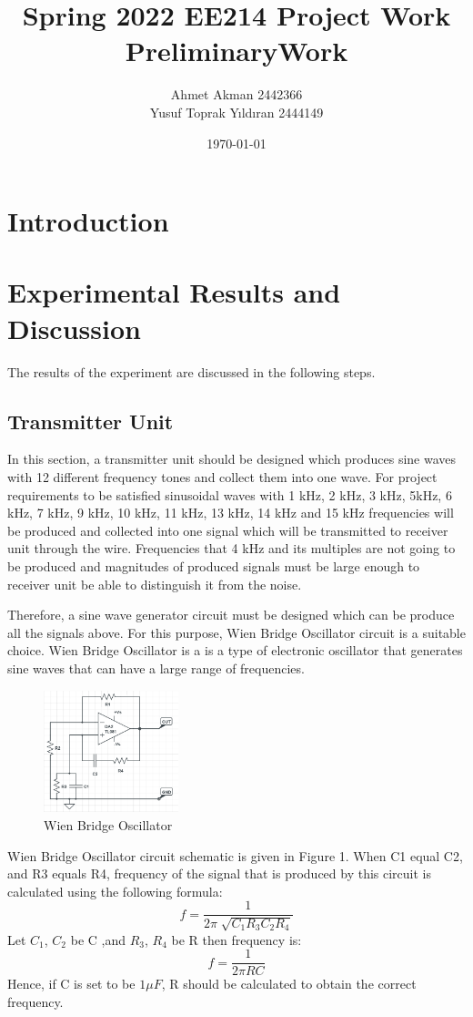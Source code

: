 \documentclass[letterpaper,12pt]{article}
\begin{document}
\thispagestyle{empty}

\title{Spring 2022 EE214 Project Work  \protect\\ PreliminaryWork }
\author{Ahmet Akman 2442366 \protect\\ Yusuf Toprak Yıldıran 2444149 }
\date{\today}
\maketitle
\tableofcontents
\section{Introduction}
\section{Experimental Results and Discussion}
The results of the experiment are discussed in the following steps.
%
\subsection{Transmitter Unit}
In this section, a transmitter unit should be designed which produces sine waves with 12 different frequency tones and collect them into one wave. For project requirements to be satisfied sinusoidal waves with 1 kHz, 2 kHz, 3 kHz, 5kHz, 6 kHz, 7 kHz, 9 kHz, 10 kHz, 11 kHz, 13 kHz, 14 kHz and 15 kHz frequencies will be produced and collected into one signal which will be transmitted to receiver unit through the wire. Frequencies that 4 kHz and its multiples are not going to be produced and magnitudes of produced signals must be large enough to receiver unit be able to distinguish it from the noise.

Therefore, a sine wave generator circuit must be designed which can be produce all the signals above. For this purpose, Wien Bridge Oscillator circuit is a suitable choice. Wien Bridge Oscillator is a is a type of electronic oscillator that generates sine waves that can have a large range of frequencies.
\begin{figure}[H]
    \centering
    \includegraphics[width = 0.35\textwidth]{WIENBRDGE.png}
    \caption{Wien Bridge Oscillator}
\end{figure} 
Wien Bridge Oscillator circuit schematic is given in Figure 1. When C1 equal C2, and R3 equals R4, frequency of the signal that is produced by this circuit is calculated using the following formula:
\[f = \frac{1}{2\pi \sqrt[]{C_1R_3C_2R_4}}\]
Let \(C_1\), \(C_2\) be C ,and \(R_3\), \(R_4\) be R then frequency is:
\[f = \frac{1}{2\pi RC}\]
Hence, if C is set to be \(1\mu F\), R should be calculated to obtain the correct frequency. 
\end{document}

